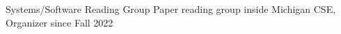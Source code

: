 

\begin{cvlist}

  \cvlistitem
    {Systems/Software Reading Group} %
    {Paper reading group inside Michigan CSE, Organizer since Fall 2022} %

\end{cvlist}
